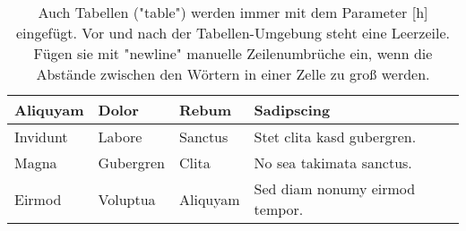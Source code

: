 \begin{table}[h] %
	\caption[Od quo tecto offic torit eteum acerum fuga. Ideni omnihic idundero doluptus iminvel luptati busdaepta sequi dolorec tatessinum.]{Auch Tabellen ("table") werden immer mit dem Parameter [h] eingefügt. Vor und nach der Tabellen-Umgebung steht eine Leerzeile. Fügen sie mit "newline" manuelle Zeilenumbrüche ein, wenn die Abstände zwischen den Wörtern in einer Zelle zu groß werden.}
	\centering
	\begin{tabular}{ | l | l | l | p{2.5cm} |}
			\hline
			Aliquyam & Dolor & Rebum & Sadipscing \\ \hline
			Invidunt & Labore & Sanctus & Stet clita kasd \newline gubergren. \\ \hline
			Magna & Gubergren & Clita & No sea takimata \newline sanctus. \\ \hline
			Eirmod & Voluptua & Aliquyam & Sed diam nonumy eirmod tempor. \\
			\hline%
	\end{tabular}%
	\label{tab:tab}%
\end{table}%

